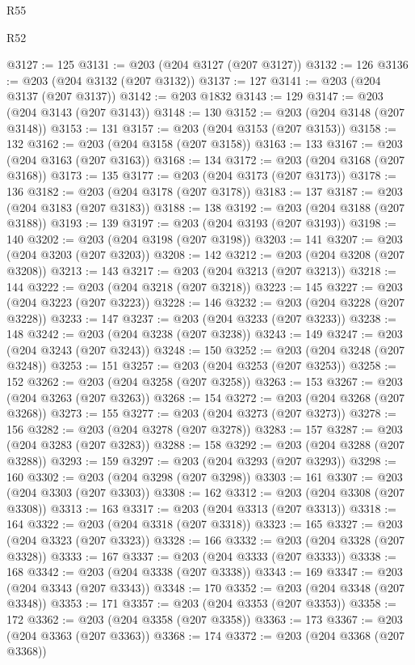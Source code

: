 \begin{lexlean}{R55}
\begin{lexlean}{R52}
\begin{coremodule}
{{{{{{{{{{{{{{{{{{{{{{{{{{{{{{{{{{{{{{{{{{{{{{{{{{{{{{{{{{{{{{{{{{{{{{{{{{{{{{{{{{{{{{{{{{{{{{{{{{{{{{{{{{{{{{{{{{{{{{{{{{{{{{{{{{{{{{{{{{{{{{{{{{{{{{{{{{{{{{{{{{{{{{{{{{{{{{{{{{{{{{{{{{{{{{{{{{{{{{@3127 := 125
@3131 := @203 (@204 @3127 (@207 @3127))
@3132 := 126
@3136 := @203 (@204 @3132 (@207 @3132))
@3137 := 127
@3141 := @203 (@204 @3137 (@207 @3137))
@3142 := @203 @1832
@3143 := 129
@3147 := @203 (@204 @3143 (@207 @3143))
@3148 := 130
@3152 := @203 (@204 @3148 (@207 @3148))
@3153 := 131
@3157 := @203 (@204 @3153 (@207 @3153))
@3158 := 132
@3162 := @203 (@204 @3158 (@207 @3158))
@3163 := 133
@3167 := @203 (@204 @3163 (@207 @3163))
@3168 := 134
@3172 := @203 (@204 @3168 (@207 @3168))
@3173 := 135
@3177 := @203 (@204 @3173 (@207 @3173))
@3178 := 136
@3182 := @203 (@204 @3178 (@207 @3178))
@3183 := 137
@3187 := @203 (@204 @3183 (@207 @3183))
@3188 := 138
@3192 := @203 (@204 @3188 (@207 @3188))
@3193 := 139
@3197 := @203 (@204 @3193 (@207 @3193))
@3198 := 140
@3202 := @203 (@204 @3198 (@207 @3198))
@3203 := 141
@3207 := @203 (@204 @3203 (@207 @3203))
@3208 := 142
@3212 := @203 (@204 @3208 (@207 @3208))
@3213 := 143
@3217 := @203 (@204 @3213 (@207 @3213))
@3218 := 144
@3222 := @203 (@204 @3218 (@207 @3218))
@3223 := 145
@3227 := @203 (@204 @3223 (@207 @3223))
@3228 := 146
@3232 := @203 (@204 @3228 (@207 @3228))
@3233 := 147
@3237 := @203 (@204 @3233 (@207 @3233))
@3238 := 148
@3242 := @203 (@204 @3238 (@207 @3238))
@3243 := 149
@3247 := @203 (@204 @3243 (@207 @3243))
@3248 := 150
@3252 := @203 (@204 @3248 (@207 @3248))
@3253 := 151
@3257 := @203 (@204 @3253 (@207 @3253))
@3258 := 152
@3262 := @203 (@204 @3258 (@207 @3258))
@3263 := 153
@3267 := @203 (@204 @3263 (@207 @3263))
@3268 := 154
@3272 := @203 (@204 @3268 (@207 @3268))
@3273 := 155
@3277 := @203 (@204 @3273 (@207 @3273))
@3278 := 156
@3282 := @203 (@204 @3278 (@207 @3278))
@3283 := 157
@3287 := @203 (@204 @3283 (@207 @3283))
@3288 := 158
@3292 := @203 (@204 @3288 (@207 @3288))
@3293 := 159
@3297 := @203 (@204 @3293 (@207 @3293))
@3298 := 160
@3302 := @203 (@204 @3298 (@207 @3298))
@3303 := 161
@3307 := @203 (@204 @3303 (@207 @3303))
@3308 := 162
@3312 := @203 (@204 @3308 (@207 @3308))
@3313 := 163
@3317 := @203 (@204 @3313 (@207 @3313))
@3318 := 164
@3322 := @203 (@204 @3318 (@207 @3318))
@3323 := 165
@3327 := @203 (@204 @3323 (@207 @3323))
@3328 := 166
@3332 := @203 (@204 @3328 (@207 @3328))
@3333 := 167
@3337 := @203 (@204 @3333 (@207 @3333))
@3338 := 168
@3342 := @203 (@204 @3338 (@207 @3338))
@3343 := 169
@3347 := @203 (@204 @3343 (@207 @3343))
@3348 := 170
@3352 := @203 (@204 @3348 (@207 @3348))
@3353 := 171
@3357 := @203 (@204 @3353 (@207 @3353))
@3358 := 172
@3362 := @203 (@204 @3358 (@207 @3358))
@3363 := 173
@3367 := @203 (@204 @3363 (@207 @3363))
@3368 := 174
@3372 := @203 (@204 @3368 (@207 @3368))
}}}}}}}}}}}}}}}}}}}}}}}}}}}}}}}}}}}}}}}}}}}}}}}}}}}}}}}}}}}}}}}}}}}}}}}}}}}}}}}}}}}}}}}}}}}}}}}}}}}}}}}}}}}}}}}}}}}}}}}}}}}}}}}}}}}}}}}}}}}}}}}}}}}}}}}}}}}}}}}}}}}}}}}}}}}}}}}}}}}}}}}}}}}}}}}}}}}}}}
\end{coremodule}
\end{lexlean}
\end{lexlean}
